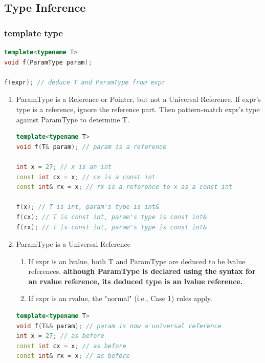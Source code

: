 \documentclass[a4paper,12pt,twoside]{book}
\begin{document}
\subsection{Type Inference}

\subsubsection{template type}

\begin{lstlisting}[frame=single, language=c++]
template<typename T>
void f(ParamType param);

f(expr); // deduce T and ParamType from expr
\end{lstlisting}

\begin{enumerate}

\item ParamType is a Reference or Pointer, but not a Universal Reference. If expr's type is a reference, ignore the reference part. Then pattern-match expr's type against ParamType to determine T.
\begin{lstlisting}[frame=single, language=c++]
template<typename T>
void f(T& param); // param is a reference

int x = 27; // x is an int
const int cx = x; // cx is a const int
const int& rx = x; // rx is a reference to x as a const int

f(x); // T is int, param's type is int&
f(cx); // T is const int, param's type is const int&
f(rx); // T is const int, param's type is const int&
\end{lstlisting}

\item ParamType is a Universal Reference

\begin{enumerate}
\item If expr is an lvalue, both T and ParamType are deduced to be lvalue references.
\textbf{although ParamType is declared using the syntax for an rvalue reference, its deduced type is an lvalue reference.}
\item If expr is an rvalue, the "normal" (i.e., Case 1) rules apply.
\end{enumerate}

\begin{lstlisting}[frame=single, language=c++]
template<typename T>
void f(T&& param); // param is now a universal reference
int x = 27; // as before
const int cx = x; // as before
const int& rx = x; // as before


\end{lstlisting}
\end{enumerate}
\end{document}

